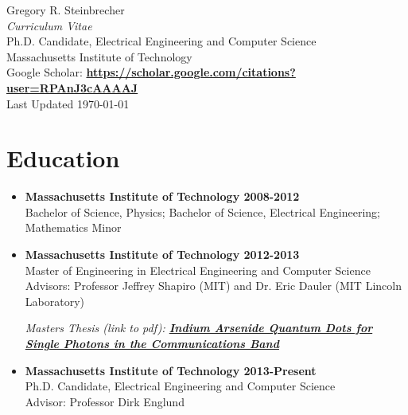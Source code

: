 \documentclass[letterpaper,12pt]{article}
\begin{document}
\begin{center}
{\huge Gregory R. Steinbrecher}\\
{\large \emph{Curriculum Vitae}}\\
\vspace{5mm}
{\normalsize Ph.D. Candidate, Electrical Engineering and Computer Science\\
Massachusetts Institute of Technology}\\

{\small Google Scholar: \href{https://scholar.google.com/citations?user=RPAnJ3cAAAAJ}{\textbf{https://scholar.google.com/citations?user=RPAnJ3cAAAAJ}}}\\
\vspace{5mm}
{\small Last Updated \today}\\
\end{center}

\section{Education}

\begin{itemize}

\item \textbf{Massachusetts Institute of Technology 2008-2012}\\
Bachelor of Science, Physics; Bachelor of Science, Electrical Engineering; Mathematics Minor

\item \textbf{Massachusetts Institute of Technology 2012-2013}\\
Master of Engineering in Electrical Engineering and Computer Science\\
Advisors: Professor Jeffrey Shapiro (MIT) and Dr. Eric Dauler (MIT Lincoln Laboratory)

\vspace{0.5em}

{\small \emph{Masters Thesis (link to pdf): \href{http://web.mit.edu/gstein/www/steinbrecher-meng-thesis.pdf}{\textbf{Indium Arsenide Quantum Dots for Single Photons in the Communications Band}}}}

\item \textbf{Massachusetts Institute of Technology 2013-Present}\\
Ph.D. Candidate, Electrical Engineering and Computer Science\\
Advisor: Professor Dirk Englund

\end{itemize}
\end{document}
